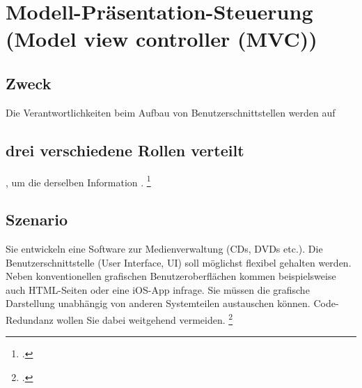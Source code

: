 \documentclass{lehramt-informatik-haupt}
\begin{document}

\chapter{Modell-Präsentation-Steuerung (Model view controller (MVC))}

\begin{liQuellen}
\item \cite{wiki:mvc}
\item \cite[Kapitel „Observer“, Seite 256]{gof}
\item \cite[Kapitel 5.6, Seite 92-95]{eilebrecht}
\item \cite[Kapitel 3.8, Seite 48-49]{siebler}
\end{liQuellen}

%

\section{Zweck}

Die Verantwortlichkeiten beim Aufbau von Benutzerschnittstellen werden
auf \section{drei verschiedene Rollen verteilt}, um die
 derselben Information .
\footcite[Seite 92]{eilebrecht}

%

\section{Szenario}

Sie entwickeln eine Software zur Medienverwaltung (CDs, DVDs etc.). Die
Benutzerschnittstelle (User Interface, UI) soll möglichst flexibel
gehalten werden. Neben konventionellen grafischen Benutzeroberflächen
kommen beispielsweise auch HTML-Seiten oder eine iOS-App infrage. Sie
müssen die grafische Darstellung unabhängig von anderen Systemteilen
austauschen können. Code-Redundanz wollen Sie dabei weitgehend
vermeiden.
\footcite[Seite 92]{eilebrecht}

\literatur
\end{document}
